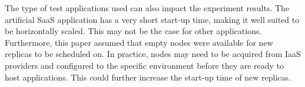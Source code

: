 The type of test applications used can also impact the experiment results. The artificial SaaS application has a very short start-up time, making it well suited to be horizontally scaled. This may not be the case for other applications. Furthermore, this paper assumed that empty nodes were available for new replicas to be scheduled on. In practice, nodes may need to be acquired from IaaS providers and configured to the specific environment before they are ready to host applications. This could further increase the start-up time of new replicas. 